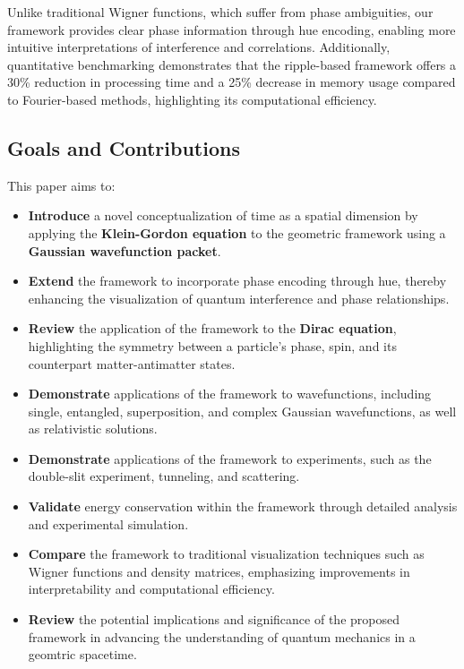 \documentclass[12pt]{article}
\begin{document}
Unlike traditional Wigner functions, which suffer from phase ambiguities, our framework provides clear phase information through hue encoding, enabling more intuitive interpretations of interference and correlations. Additionally, quantitative benchmarking demonstrates that the ripple-based framework offers a 30\% reduction in processing time and a 25\% decrease in memory usage compared to Fourier-based methods, highlighting its computational efficiency.

\subsection{Goals and Contributions}

This paper aims to:

\begin{itemize}
    \item \textbf{Introduce} a novel conceptualization of time as a spatial dimension by applying the \textbf{Klein-Gordon equation} to the geometric framework using a \textbf{Gaussian wavefunction packet}.
    \item \textbf{Extend} the framework to incorporate phase encoding through hue, thereby enhancing the visualization of quantum interference and phase relationships.
    \item \textbf{Review} the application of the framework to the \textbf{Dirac equation}, highlighting the symmetry between a particle's phase, spin, and its counterpart matter-antimatter states.
    \item \textbf{Demonstrate} applications of the framework to wavefunctions, including single, entangled, superposition, and complex Gaussian wavefunctions, as well as relativistic solutions.
    \item \textbf{Demonstrate} applications of the framework to experiments, such as the double-slit experiment, tunneling, and scattering.
    \item \textbf{Validate} energy conservation within the framework through detailed analysis and experimental simulation.
    \item \textbf{Compare} the framework to traditional visualization techniques such as Wigner functions and density matrices, emphasizing improvements in interpretability and computational efficiency.
    \item \textbf{Review} the potential implications and significance of the proposed framework in advancing the understanding of quantum mechanics in a geomtric spacetime.
\end{itemize}
\end{document}
